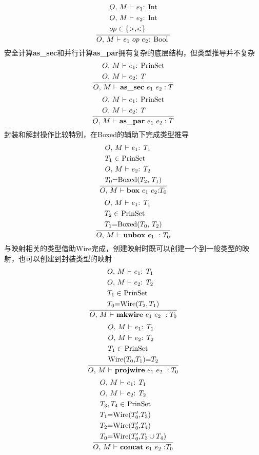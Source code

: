 \[
\infertext {
&\textrm{$O$, $M$ $\vdash$ $e_1$: Int}\\
&\textrm{$O$, $M$ $\vdash$ $e_2$: Int}\\
&\textrm{$op\in \{\text{>,<}\}$}
}{$O$, $M$ $\vdash$ $e_1\ op\ e_2$: Bool }
\]
安全计算\textbf{as\_sec}和并行计算\textbf{as\_par}拥有复杂的底层结构，但类型推导并不复杂
\[
\infertext {
&\textrm{$O$, $M$ $\vdash$ $e_1$: PrinSet}\\
&\textrm{$O$, $M$ $\vdash$ $e_2$: $T$}
}{$O$, $M$ $\vdash$ $\textbf{as\_sec}\ e_1\ e_2:T$}
\]
\[
\infertext {
&\textrm{$O$, $M$ $\vdash$ $e_1$: PrinSet}\\
&\textrm{$O$, $M$ $\vdash$ $e_2$: $T$}
}{$O$, $M$ $\vdash$ $\textbf{as\_par}\ e_1\ e_2:T$}
\]
封装和解封操作比较特别，在Boxed的辅助下完成类型推导
\[
\infertext {
&\textrm{$O$, $M$ $\vdash$ $e_1$: $T_1$}\\
&\textrm{$T_1$ $\in$ PrinSet}\\
&\textrm{$O$, $M$ $\vdash$ $e_2$: $T_2$}\\
&\textrm{$T_0$=Boxed($T_2$, $T_1$)}
}{$O$, $M$ $\vdash$ \textbf{box} $e_1$ $e_2$:$T_0$}
\]
\[
\infertext {
&\textrm{$O$, $M$ $\vdash$ $e_1$: $T_1$}\\
&\textrm{$T_2\in$ PrinSet}\\
&\textrm{$T_1$=Boxed($T_0$, $T_2$)}
}{$O$, $M$ $\vdash$ $\textbf{unbox}\ e_1\ :T_0$}
\]
与映射相关的类型借助Wire完成，创建映射时既可以创建一个到一般类型的映射，也可以创建到封装类型的映射
\[
\infertext {
&\textrm{$O$, $M$ $\vdash$ $e_1$: $T_1$}\\
&\textrm{$O$, $M$ $\vdash$ $e_2$: $T_2$}\\
&\textrm{$T_1\in$ PrinSet}\\
&\textrm{$T_0$=Wire$(T_2,T_1)$}
}{$O$, $M$ $\vdash$ $\textbf{mkwire}\ e_1\ e_2\ :T_0$}
\]
\[
\infertext {
&\textrm{$O$, $M$ $\vdash$ $e_1$: $T_1$}\\
&\textrm{$O$, $M$ $\vdash$ $e_2$: $T_2$}\\
&\textrm{$T_1\in$ PrinSet}\\
&\textrm{Wire($T_0$,$T_1$)=$T_2$}
}{$O$, $M$ $\vdash$ $\textbf{projwire}\ e_1\ e_2\ :T_0$}
\]
\[
\infertext {
&\textrm{$O$, $M$ $\vdash$ $e_1$: $T_1$}\\
&\textrm{$O$, $M$ $\vdash$ $e_2$: $T_2$}\\
&\textrm{$T_3,T_4\in$ PrinSet}\\
&\textrm{$T_1$=Wire($T_0'$,$T_3$)}\\
&\textrm{$T_2$=Wire($T_0'$,$T_4$)}\\
&\textrm{$T_0$=Wire($T_0'$,$T_3\cup T_4$)}
}{$O$, $M$ $\vdash$ \textbf{concat} $e_1$ $e_2$ :$T_0$}
\]

